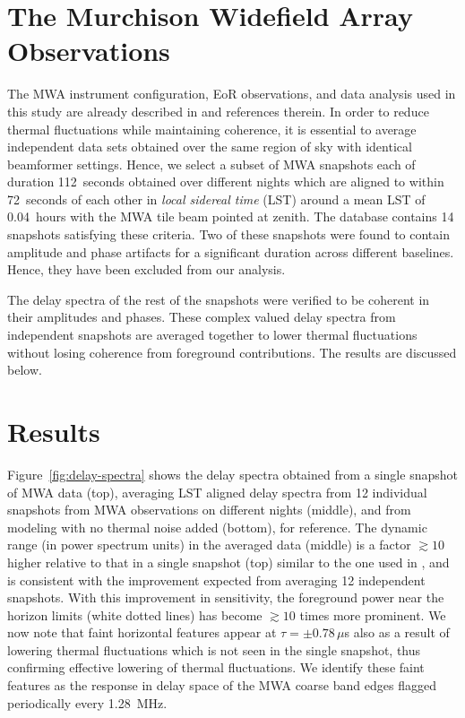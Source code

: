 \documentclass[preprint2,apjl,numberedappendix,twocolappendix,appendixfloats]{emulateapj}
\begin{document}
\section{The Murchison Widefield Array Observations}\label{sec:MWA}

The MWA instrument configuration, EoR observations, and data analysis used in this study are already described in \citet{thy15} and references therein. In order to reduce thermal fluctuations while maintaining coherence, it is essential to average independent data sets obtained over the same region of sky with identical beamformer settings. Hence, we select a subset of MWA snapshots each of duration 112~seconds obtained over different nights which are aligned to within 72~seconds of each other in {\it local sidereal time} (LST) around a mean LST of 0.04~hours with the MWA tile beam pointed at zenith. The database contains 14 snapshots satisfying these criteria. Two of these snapshots were found to contain amplitude and phase artifacts for a significant duration across different baselines. Hence, they have been excluded from our analysis. 

The delay spectra of the rest of the snapshots were verified to be coherent in their amplitudes and phases. These complex valued delay spectra from independent snapshots are averaged together to lower thermal fluctuations without losing coherence from foreground contributions. The results are discussed below.

\section{Results}\label{sec:results}

Figure~\ref{fig:delay-spectra} shows the delay spectra obtained from a single snapshot of MWA data (top), averaging LST aligned delay spectra from 12 individual snapshots from MWA observations on different nights (middle), and from modeling \citep{thy15} with no thermal noise added (bottom), for reference. The dynamic range (in power spectrum units) in the averaged data (middle) is a factor $\gtrsim 10$ higher relative to that in a single snapshot (top) similar to the one used in \citet{thy15}, and is consistent with the improvement expected from averaging 12 independent snapshots. With this improvement in sensitivity, the foreground power near the horizon limits (white dotted lines) has become $\gtrsim 10$ times more prominent. We now note that faint horizontal features appear at $\tau = \pm 0.78\,\mu$s also as a result of lowering thermal fluctuations which is not seen in the single snapshot, thus confirming effective lowering of thermal fluctuations. We identify these faint features as the response in delay space of the MWA coarse band edges flagged periodically every 1.28~MHz. 
\end{document}

